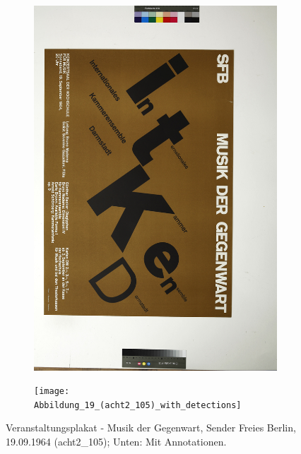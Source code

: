 \documentclass[a4paper,12pt,ngerman]{article}
\begin{document}
\newpage
\begin{figure}[ht]
	\begin{subfigure}[b]{\linewidth}
	\centering
	\includegraphics[height=\linewidth, angle=90]{Abbildung_23_(acht2_105)}
	\end{subfigure}
	\begin{subfigure}[b]{\linewidth}
	\centering
	\texttt{[image: Abbildung\_19\_(acht2\_105)\_with\_detections]}
	\end{subfigure}
	\caption{Veranstaltungsplakat - Musik der Gegenwart, Sender Freies Berlin, 19.09.1964 (acht2\_105); Unten: Mit Annotationen.}
\end{figure}
\end{document}
